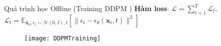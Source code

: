 \begin{frame}{Quá trình học Offline (Training $\text{DDPM}$ )}
	\textbf{Hàm loss}: $\mathcal{L} = \sum_{t=1}^{T} \mathcal{L}_t$. 
	$\mathcal{L}_{t}= \mathbb{E}_{\mathbf{x}_{0}, \epsilon_t \sim \mathcal{N}(0, I), t} \left[ \| \epsilon_t - \epsilon_\theta(\mathbf{x}_t, t) \|^2 \right]$
	
	\begin{figure}
		\centering
		\texttt{[image: DDPMTraining]}
	\end{figure}
\end{frame}

%	

